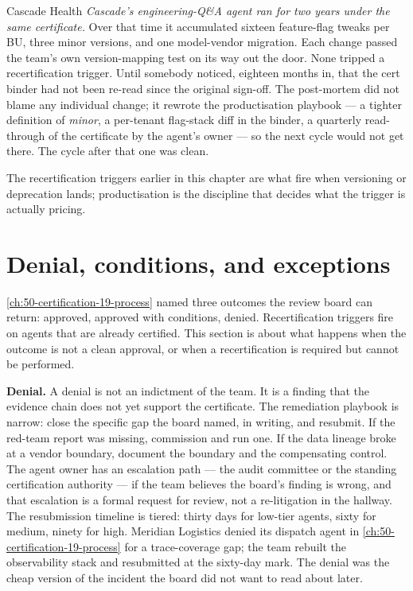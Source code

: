 \begin{TNinpractice}{Cascade Health} \textit{Cascade's engineering-Q\&A agent ran for two years under the same certificate.} Over that time it accumulated sixteen feature-flag tweaks per BU, three minor versions, and one model-vendor migration. Each change passed the team's own version-mapping test on its way out the door. None tripped a recertification trigger. Until somebody noticed, eighteen months in, that the cert binder had not been re-read since the original sign-off. The post-mortem did not blame any individual change; it rewrote the productisation playbook --- a tighter definition of \textit{minor}, a per-tenant flag-stack diff in the binder, a quarterly read-through of the certificate by the agent's owner --- so the next cycle would not get there. The cycle after that one was clean. \end{TNinpractice}

The recertification triggers earlier in this chapter are what fire when versioning or deprecation lands; productisation is the discipline that decides what the trigger is actually pricing.

\section{Denial, conditions, and exceptions}

\autoref{ch:50-certification-19-process} named three outcomes the review board can return: approved, approved with conditions, denied. Recertification triggers fire on agents that are already certified. This section is about what happens when the outcome is not a clean approval, or when a recertification is required but cannot be performed.

\textbf{Denial.} A denial is not an indictment of the team. It is a finding that the evidence chain does not yet support the certificate. The remediation playbook is narrow: close the specific gap the board named, in writing, and resubmit. If the red-team report was missing, commission and run one. If the data lineage broke at a vendor boundary, document the boundary and the compensating control. The agent owner has an escalation path --- the audit committee or the standing certification authority --- if the team believes the board's finding is wrong, and that escalation is a formal request for review, not a re-litigation in the hallway. The resubmission timeline is tiered: thirty days for low-tier agents, sixty for medium, ninety for high. Meridian Logistics denied its dispatch agent in \autoref{ch:50-certification-19-process} for a trace-coverage gap; the team rebuilt the observability stack and resubmitted at the sixty-day mark. The denial was the cheap version of the incident the board did not want to read about later.

